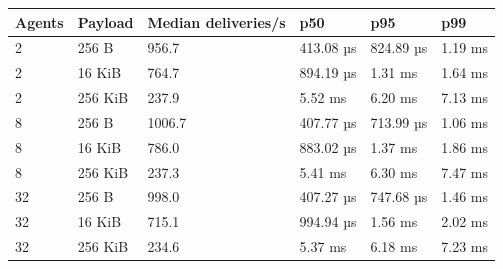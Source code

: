 \begin{tabular}{llllll}
\hline
Agents & Payload & Median deliveries/s & p50 & p95 & p99 \\
\hline
2 & 256 B & 956.7 & 413.08 µs & 824.89 µs & 1.19 ms \\
2 & 16 KiB & 764.7 & 894.19 µs & 1.31 ms & 1.64 ms \\
2 & 256 KiB & 237.9 & 5.52 ms & 6.20 ms & 7.13 ms \\
8 & 256 B & 1006.7 & 407.77 µs & 713.99 µs & 1.06 ms \\
8 & 16 KiB & 786.0 & 883.02 µs & 1.37 ms & 1.86 ms \\
8 & 256 KiB & 237.3 & 5.41 ms & 6.30 ms & 7.47 ms \\
32 & 256 B & 998.0 & 407.27 µs & 747.68 µs & 1.46 ms \\
32 & 16 KiB & 715.1 & 994.94 µs & 1.56 ms & 2.02 ms \\
32 & 256 KiB & 234.6 & 5.37 ms & 6.18 ms & 7.23 ms \\
\hline
\end{tabular}
